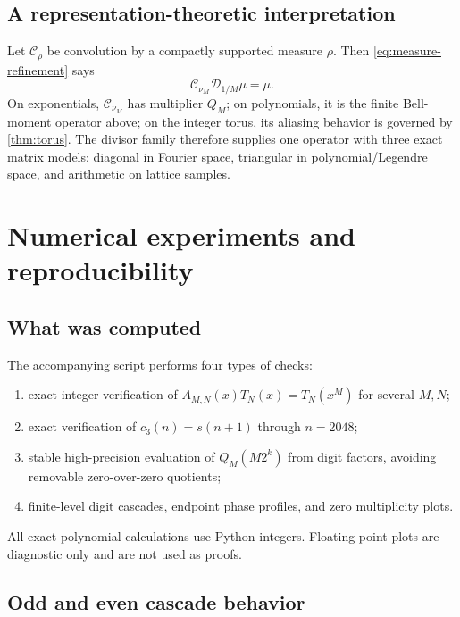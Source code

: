 \documentclass[11pt,oneside]{article}
\theoremstyle{definition}
\theoremstyle{remark}
\numberwithin{equation}{section}
\newcommand{\D}{\mathcal D}
\newcommand{\1}{\mathbf 1}
\begin{document}
\subsection{A representation-theoretic interpretation}

Let $\mathcal C_{\rho}$ be convolution by a compactly supported measure $\rho$.  Then
\eqref{eq:measure-refinement} says
\begin{equation}
 \mathcal C_{\nu_M}\D_{1/M}\mu=\mu.
 \label{eq:convolution-intertwiner}
\end{equation}
On exponentials, $\mathcal C_{\nu_M}$ has multiplier $Q_M$; on polynomials, it is the
finite Bell-moment operator above; on the integer torus, its aliasing behavior is governed by
\cref{thm:torus}.  The divisor family therefore supplies one operator with three exact
matrix models: diagonal in Fourier space, triangular in polynomial/Legendre space, and
arithmetic on lattice samples.

\section{Numerical experiments and reproducibility}
\label{sec:numerics}

\subsection{What was computed}

The accompanying script  performs four types of checks:
\begin{enumerate}
\item exact integer verification of
$A_{M,N}(x)T_N(x)=T_N(x^M)$ for several $M,N$;
\item exact verification of $c_3(n)=s(n+1)$ through $n=2048$;
\item stable high-precision evaluation of $Q_M(M2^k)$ from digit factors, avoiding
removable zero-over-zero quotients;
\item finite-level digit cascades, endpoint phase profiles, and zero multiplicity plots.
\end{enumerate}
All exact polynomial calculations use Python integers.  Floating-point plots are diagnostic
only and are not used as proofs.

\subsection{Odd and even cascade behavior}
\end{document}
